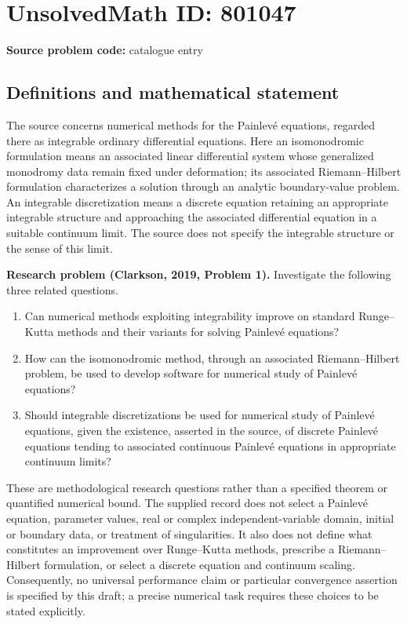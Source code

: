 \documentclass[11pt]{article}
\begin{document}
\section*{UnsolvedMath ID: 801047}
\textbf{Source problem code:} catalogue entry
\subsection{Definitions and mathematical statement}
The source concerns numerical methods for the Painlev\'e equations, regarded there as integrable ordinary differential equations. Here an isomonodromic formulation means an associated linear differential system whose generalized monodromy data remain fixed under deformation; its associated Riemann--Hilbert formulation characterizes a solution through an analytic boundary-value problem. An integrable discretization means a discrete equation retaining an appropriate integrable structure and approaching the associated differential equation in a suitable continuum limit. The source does not specify the integrable structure or the sense of this limit.

\textbf{Research problem (Clarkson, 2019, Problem 1).} Investigate the following three related questions.
\begin{enumerate}
\item Can numerical methods exploiting integrability improve on standard Runge--Kutta methods and their variants for solving Painlev\'e equations?
\item How can the isomonodromic method, through an associated Riemann--Hilbert problem, be used to develop software for numerical study of Painlev\'e equations?
\item Should integrable discretizations be used for numerical study of Painlev\'e equations, given the existence, asserted in the source, of discrete Painlev\'e equations tending to associated continuous Painlev\'e equations in appropriate continuum limits?
\end{enumerate}

These are methodological research questions rather than a specified theorem or quantified numerical bound. The supplied record does not select a Painlev\'e equation, parameter values, real or complex independent-variable domain, initial or boundary data, or treatment of singularities. It also does not define what constitutes an improvement over Runge--Kutta methods, prescribe a Riemann--Hilbert formulation, or select a discrete equation and continuum scaling. Consequently, no universal performance claim or particular convergence assertion is specified by this draft; a precise numerical task requires these choices to be stated explicitly.
\end{document}
